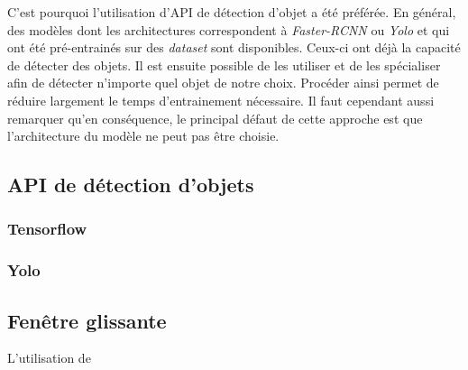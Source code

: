 C'est pourquoi l'utilisation d'API de détection d'objet a été préférée. En général, des modèles dont les architectures correspondent à \textit{Faster-RCNN} ou \textit{Yolo} et qui ont été pré-entrainés sur des \textit{dataset} sont disponibles. Ceux-ci ont déjà la capacité de détecter des objets. Il est ensuite possible de les utiliser et de les spécialiser afin de détecter n'importe quel objet de notre choix. Procéder ainsi permet de réduire largement le temps d'entrainement nécessaire. Il faut cependant aussi remarquer qu'en conséquence, le principal défaut de cette approche est que l'architecture du modèle ne peut pas être choisie.

\subsection{API de détection d'objets}


\subsubsection{Tensorflow}
\subsubsection{Yolo}











\subsection{Fenêtre glissante}
L'utilisation de 

